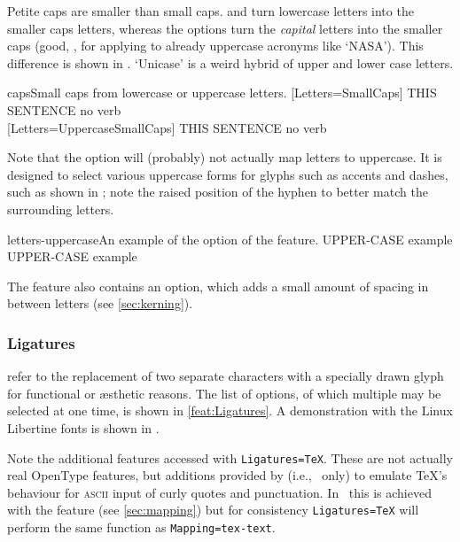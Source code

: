 \documentclass[a4paper]{l3doc}
\begin{document}
Petite caps are smaller than small caps.
 and 
turn lowercase letters into the smaller caps letters,
whereas the  options turn the \emph{capital} letters into
the smaller
caps (good, \eg, for applying to already uppercase acronyms like
`NASA').
This difference is shown in .
`Unicase' is a weird hybrid of upper and lower case letters.

\begin{Lexample}{caps}{Small caps from lowercase or uppercase letters.}
  [Letters=SmallCaps]
   THIS SENTENCE no verb                \\
  [Letters=UppercaseSmallCaps]
   THIS SENTENCE no verb
\end{Lexample}

Note that the  option will (probably)
not actually map letters to uppercase.
It is designed to select various
uppercase forms for glyphs such as accents and dashes, such as shown
in ; note the raised position of the hyphen
to better match the surrounding letters.

\begin{Lexample}{letters-uppercase}{An example of the  option of the  feature.}
   UPPER-CASE example \\
   UPPER-CASE example
\end{Lexample}

The  feature also contains an  option,
which adds a small amount of spacing in between letters (see \vref{sec:kerning}).


\subsubsection{Ligatures}
\label{sec:ot-feat-liga}

 refer to the replacement of two separate characters
with a specially drawn glyph for functional or \ae sthetic reasons.
The list of options, of which multiple may be selected at one time,
is shown in \ref{feat:Ligatures}.
A demonstration with the Linux Libertine fonts is shown in .

Note the additional features accessed with \verb|Ligatures=TeX|. These are
not actually real OpenType features, but additions provided by  (i.e., \LuaTeX\ only) to emulate \TeX's behaviour for \textsc{ascii} input of curly quotes and punctuation. In \XeTeX\ this is achieved with the  feature (see \vref{sec:mapping}) but for consistency \verb|Ligatures=TeX| will perform the same function as \verb|Mapping=tex-text|.
\end{document}
